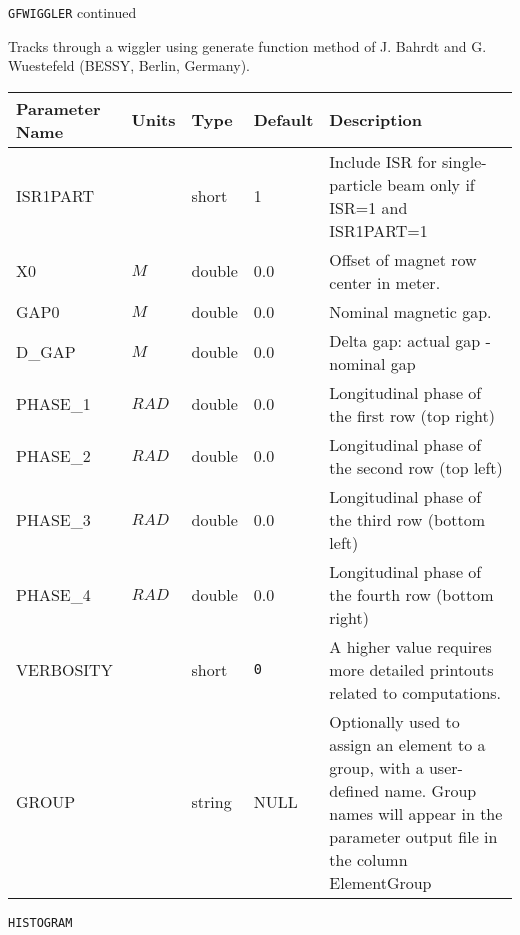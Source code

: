 \newpage
\begin{center}{\Large\verb|GFWIGGLER| continued}\end{center}
Tracks through a wiggler using generate function method of J. Bahrdt and G. Wuestefeld (BESSY, Berlin, Germany).
\\
\begin{tabular}{|l|l|l|l|p{\descwidth}|} \hline
Parameter Name & Units & Type & Default & Description \\ \hline 
ISR1PART &  & short &   1               & Include ISR for single-particle beam only if ISR=1 and ISR1PART=1  \\ \hline 
X0 & $M$ & double &  0.0 & Offset of magnet row center in meter.  \\ \hline 
GAP0 & $M$ & double &  0.0 & Nominal magnetic gap.  \\ \hline 
D\_GAP & $M$ & double &  0.0 & Delta gap: actual gap - nominal gap  \\ \hline 
PHASE\_1 & $RAD$ & double &  0.0 & Longitudinal phase of the first row (top right)  \\ \hline 
PHASE\_2 & $RAD$ & double &  0.0 & Longitudinal phase of the second row (top left)  \\ \hline 
PHASE\_3 & $RAD$ & double &  0.0 & Longitudinal phase of the third row (bottom left)  \\ \hline 
PHASE\_4 & $RAD$ & double &  0.0 & Longitudinal phase of the fourth row (bottom right)   \\ \hline 
VERBOSITY &  & short &  \verb|0| & A higher value requires more detailed printouts related to computations.  \\ \hline 
GROUP &  & string & NULL & Optionally used to assign an element to a group, with a user-defined name.  Group names will appear in the parameter output file in the column ElementGroup  \\ \hline 
\end{tabular}

\vspace*{0.5in}

\newpage
\begin{center}{\Large\verb|HISTOGRAM|}\end{center}
